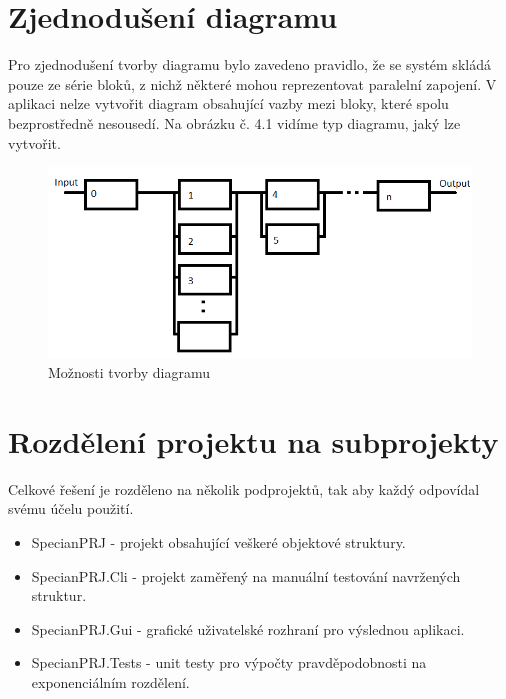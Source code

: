 \documentclass[FM,RP]{tulthesis}
\begin{document}
    \section*{Zjednodušení diagramu}
        Pro zjednodušení tvorby diagramu bylo zavedeno pravidlo, že se systém skládá pouze ze série bloků, z nichž některé mohou reprezentovat paralelní zapojení.
        V aplikaci nelze vytvořit diagram obsahující vazby mezi bloky, které spolu bezprostředně nesousedí. Na obrázku č. 4.1 vidíme typ diagramu, jaký lze vytvořit.
        \begin{figure}[h]
          \centering
           \includegraphics[scale=0.55]{pic/moznosti.png}
           \caption{Možnosti tvorby diagramu} 
        \end{figure}

    \section*{Rozdělení projektu na subprojekty}
        Celkové řešení je rozděleno na několik podprojektů, tak aby každý odpovídal svému účelu použití.
        \begin{itemize} 
        \item SpecianPRJ - projekt obsahující veškeré objektové struktury.
        \item SpecianPRJ.Cli - projekt zaměřený na manuální testování navržených struktur.
        \item SpecianPRJ.Gui - grafické uživatelské rozhraní pro výslednou aplikaci.
        \item SpecianPRJ.Tests - unit testy pro výpočty pravděpodobnosti na exponenciálním rozdělení.
        \end{itemize}
\end{document}
